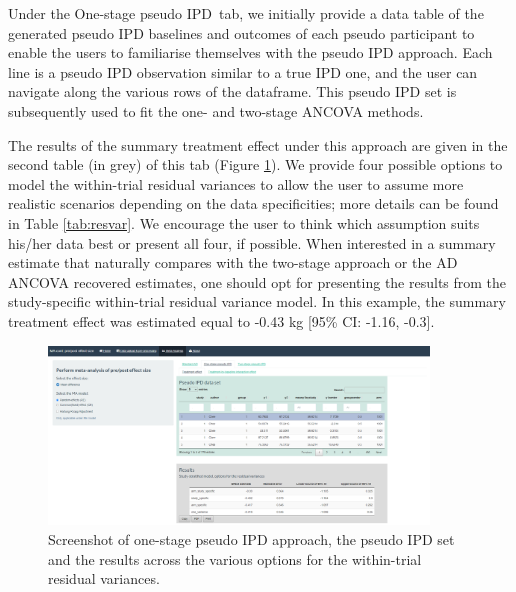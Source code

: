 \documentclass[AMA,STIX1COL]{WileyNJD-v2}
\begin{document}
Under the \textquotesingle One-stage pseudo IPD\textquotesingle\ tab, we initially provide a data table of the generated pseudo IPD baselines and outcomes of each pseudo participant to enable the users to familiarise themselves with the pseudo IPD approach. Each line is a pseudo IPD observation similar to a true IPD one, and the user can navigate along the various rows of the dataframe. This pseudo IPD set is subsequently used to fit the one- and two-stage ANCOVA methods. 

The results of the summary treatment effect under this approach are given in the second table (in grey) of this tab (Figure \ref{fig:shiny-one-stage}). We provide four possible options to model the within-trial residual variances to allow the user to assume more realistic scenarios depending on the data specificities; {\color{blue} more details can be found in Table \ref{tab:resvar}}. We encourage the user to think which assumption suits his/her data best or present all four, if possible. When interested in a summary estimate that naturally compares with the two-stage approach or the AD ANCOVA recovered estimates, one should opt for presenting the results from the study-specific within-trial residual variance model. In this example, the summary treatment effect was estimated equal to -0.43 kg [95\% CI: -1.16, -0.3].


\begin{figure}[t]
  \centering \includegraphics[width=0.9\textwidth]{One stage_shiny.jpeg}
    \caption{\small {Screenshot of one-stage pseudo IPD approach, the pseudo IPD set and the results across the various options for the within-trial residual variances.}} \label{fig:shiny-one-stage}
\end{figure}
\end{document}
